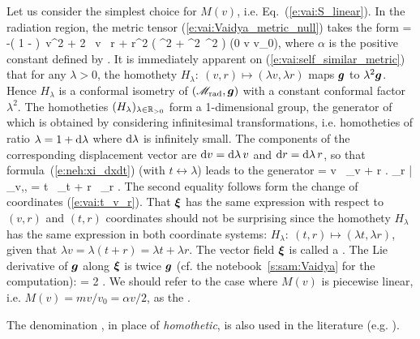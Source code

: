 Let us consider the simplest choice for $M(v)$, i.e.
Eq.~(\ref{e:vai:S_linear}).
In the radiation region, the metric tensor (\ref{e:vai:Vaidya_metric_null})
takes the form
\be \label{e:vai:self_similar_metric}
     = -\left( 1 - \alpha {} \right)\, \dd v^2
            + 2 \, \dd v \, \dd r
        + r^2 \left( \dd\th^2 + \sin^2\th\, \dd\ph^2 \right) \qquad
        (0 \leq v \leq v_0),
\ee
where $\alpha$ is the positive constant defined by
\be \label{e:vai:def_alpha}
   .
\ee
It is immediately apparent on (\ref{e:vai:self_similar_metric})
that for any $\lambda > 0$, the homothety $H_\lambda:\ (v, r) \mapsto (\lambda v, \lambda r)$
maps $\bm{g}$ to $\lambda^2 \bm{g}$. Hence $H_\lambda$ is a
conformal isometry of
$(\mathscr{M}_{\rm rad},\bm{g})$ with a constant conformal factor $\lambda^2$. The homotheties $(H_\lambda)_{\lambda\in \mathbb{R}_{>0}}$
form a 1-dimensional
group, the generator of which is obtained by considering infinitesimal transformations,
i.e. homotheties of ratio $\lambda = 1 + \mathrm{d}\lambda$ where $\mathrm{d}\lambda$ is
infinitely small. The components of the corresponding displacement vector are $\mathrm{d} v = \mathrm{d}\lambda \, v$
and $\mathrm{d} r = \mathrm{d}\lambda\,  r$, so that formula~(\ref{e:neh:xi_dxdt}) (with $t \leftrightarrow \lambda$)
leads to the generator
\be \label{e:vai:hom_Killing}
    \w{\xi} = v \, \wpar_v + r \left. \wpar_r \right| _{v,\th,\ph}
            = t \, \wpar_t + r \, \wpar_r .
\ee
The second equality follows form the change of coordinates (\ref{e:vai:t_v_r}).
That $\bm{\xi}$ has the same expression with respect to $(v, r)$ and $(t, r)$
coordinates should not be surprising since the homothety $H_\lambda$ has the
same expression in both coordinate systems:  $H_\lambda:\ (t, r) \mapsto (\lambda t, \lambda r)$,
given that $\lambda v = \lambda(t + r) = \lambda t + \lambda r$.
The vector field $\bm{\xi}$ is called a
.
The Lie derivative of $\bm{g}$ along $\bm{\xi}$ is twice $\bm{g}$ (cf. the notebook~\ref{s:sam:Vaidya}
for the computation):
\be \label{e:vai:Lie_xi_g}
    \Lie{\xi}  = 2  .
\ee
We should refer to the case where $M(v)$ is piecewise linear, i.e. $M(v) = m v/v_0 = \alpha v / 2$,
as the .

\begin{remark}
The denomination ,
in place of \emph{homothetic},
is also used in the literature (e.g. \cite{Nolan01,Nolan07}).
\end{remark}

